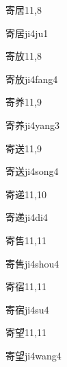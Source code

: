 \begin{entry}{寄居}{11,8}
  \begin{phonetics}{寄居}{ji4ju1}
  \end{phonetics}
\end{entry}

\begin{entry}{寄放}{11,8}
  \begin{phonetics}{寄放}{ji4fang4}
  \end{phonetics}
\end{entry}

\begin{entry}{寄养}{11,9}
  \begin{phonetics}{寄养}{ji4yang3}
  \end{phonetics}
\end{entry}

\begin{entry}{寄送}{11,9}
  \begin{phonetics}{寄送}{ji4song4}
  \end{phonetics}
\end{entry}

\begin{entry}{寄递}{11,10}
  \begin{phonetics}{寄递}{ji4di4}
  \end{phonetics}
\end{entry}

\begin{entry}{寄售}{11,11}
  \begin{phonetics}{寄售}{ji4shou4}
  \end{phonetics}
\end{entry}

\begin{entry}{寄宿}{11,11}
  \begin{phonetics}{寄宿}{ji4su4}
  \end{phonetics}
\end{entry}

\begin{entry}{寄望}{11,11}
  \begin{phonetics}{寄望}{ji4wang4}
  \end{phonetics}
\end{entry}

